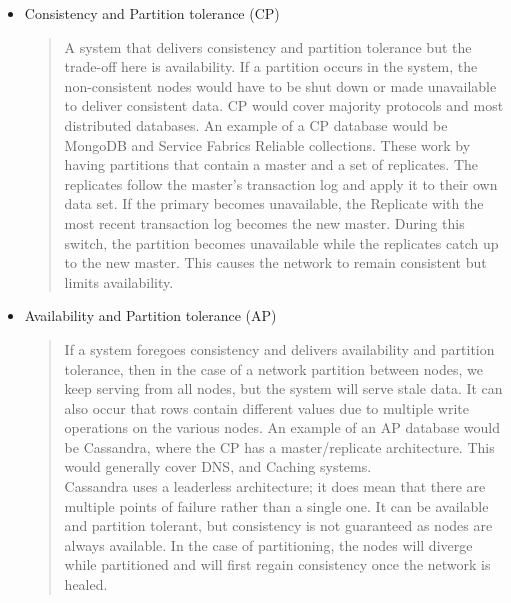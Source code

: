 \documentclass[a4paper,10pt,titlepage]{report}
\begin{document}
\begin{itemize}
    \item Consistency and Partition tolerance (CP) \\ 
    \begin{quote}
         A system that delivers consistency and partition tolerance but the trade-off here is availability. If a partition occurs in the system, the non-consistent nodes would have to be shut down or made unavailable to deliver consistent data. CP would cover majority protocols and most distributed databases. An example of a CP database would be MongoDB and Service Fabrics Reliable collections. These work by having partitions that contain a master and a set of replicates. The replicates follow the master's transaction log and apply it to their own data set. If the primary becomes unavailable, the Replicate with the most recent transaction log becomes the new master. During this switch, the partition becomes unavailable while the replicates catch up to the new master. This causes the network to remain consistent but limits availability.
    \end{quote}


    \item Availability and Partition tolerance (AP) \\ 
    \begin{quote}
    If a system foregoes consistency and delivers availability and partition tolerance, then in the case of a network partition between nodes, we keep serving from all nodes, but the system will serve stale data. It can also occur that rows contain different values due to multiple write operations on the various nodes. An example of an AP database would be Cassandra, where the CP has a master/replicate architecture. This would generally cover DNS, and Caching systems. \\ Cassandra uses a leaderless architecture; it does mean that there are multiple points of failure rather than a single one. It can be available and partition tolerant, but consistency is not guaranteed as nodes are always available. In the case of partitioning, the nodes will diverge while partitioned and will first regain consistency once the network is healed. 
    \end{quote}


\end{itemize}
\end{document}
